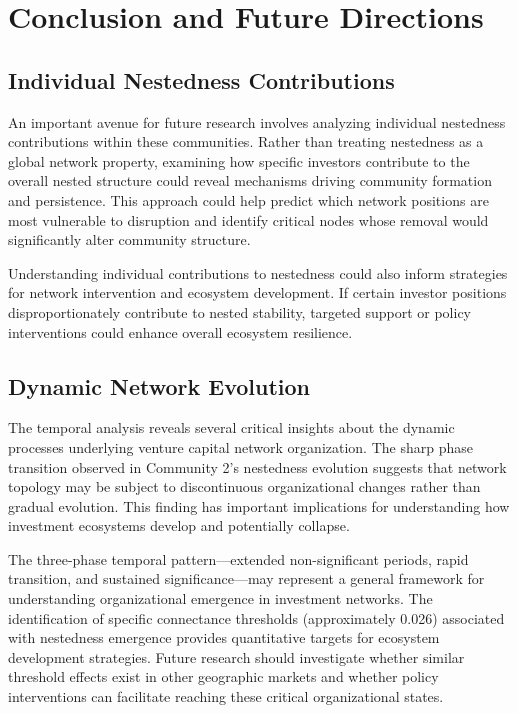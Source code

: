 \section{Conclusion and Future Directions}

\subsection{Individual Nestedness Contributions}

An important avenue for future research involves analyzing individual nestedness contributions within these communities. Rather than treating nestedness as a global network property, examining how specific investors contribute to the overall nested structure could reveal mechanisms driving community formation and persistence. This approach could help predict which network positions are most vulnerable to disruption and identify critical nodes whose removal would significantly alter community structure.

Understanding individual contributions to nestedness could also inform strategies for network intervention and ecosystem development. If certain investor positions disproportionately contribute to nested stability, targeted support or policy interventions could enhance overall ecosystem resilience.

\subsection{Dynamic Network Evolution}

The temporal analysis reveals several critical insights about the dynamic processes underlying venture capital network organization. The sharp phase transition observed in Community 2's nestedness evolution suggests that network topology may be subject to discontinuous organizational changes rather than gradual evolution. This finding has important implications for understanding how investment ecosystems develop and potentially collapse.

The three-phase temporal pattern—extended non-significant periods, rapid transition, and sustained significance—may represent a general framework for understanding organizational emergence in investment networks. The identification of specific connectance thresholds (approximately 0.026) associated with nestedness emergence provides quantitative targets for ecosystem development strategies. Future research should investigate whether similar threshold effects exist in other geographic markets and whether policy interventions can facilitate reaching these critical organizational states.

